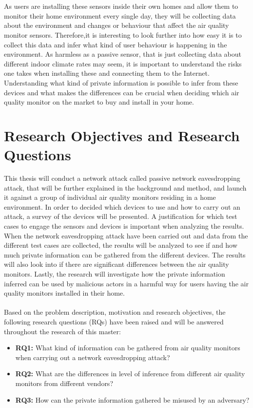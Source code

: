 \\\\
As users are installing these sensors inside their own homes and allow them to monitor their home environment every single day, they will be collecting data about the environment and changes or behaviour that affect the air quality monitor sensors. Therefore,it is interesting to look further into how easy it is to collect this data and infer what kind of user behaviour is happening in the environment. As harmless as a passive sensor, that is just collecting data about different indoor climate rates may seem, it is important to understand the risks one takes when installing these and connecting them to the Internet. Understanding what kind of private information is possible to infer from these devices and what makes the differences can be crucial when deciding which air quality monitor on the market to buy and install in your home.

\section{Research Objectives and Research Questions}
This thesis will conduct a network attack called passive network eavesdropping attack, that will be further explained in the background and method, and launch it against a group of individual air quality monitors residing in a home environment. In order to decided which devices to use and how to carry out an attack, a survey of the devices will be presented. A justification for which test cases to engage the sensors and devices is important when analyzing the results. When the network eavesdropping attack have been carried out and data  from the different test cases are collected, the results will be analyzed to see if and how much private information can be gathered from the different devices. The results will also look into if there are significant differences between the air quality monitors. Lastly, the research will investigate how the private information inferred can be used by malicious actors in a harmful way for users having the air quality monitors installed in their home.
\\\\
Based on the problem description, motivation and research objectives, the following research questions (RQs) have been raised and will be answered throughout the research of this master:
\begin{itemize}
    \item 
    \textbf{RQ1:} What kind of information can be gathered from air quality monitors when carrying out a network eavesdropping attack?\\
    \item 
    \textbf{RQ2:} What are the differences in level of inference from different air quality monitors from different vendors?\\
    \item 
    \textbf{RQ3:} How can the private information gathered be misused by an adversary?\\
\end{itemize}

